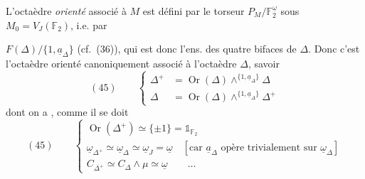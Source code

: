 \documentclass[11pt,a4paper]{article}
\begin{document}
L'octaèdre \emph{orienté} associé à $M$ est défini par le torseur $P_M/\mathbb{F}_2^{\underline{\omega}}$ sous $M_0 = V_J(\mathbb{F}_2)$, i.e. par

$F(\Delta)/\{1, \underline{a}_\Delta\}$ (cf.\ (36)), qui est donc l'ens. des quatre bifaces de $\Delta$. Donc c'est l'octaèdre orienté canoniquement associé à l'octaèdre $\Delta$, savoir
\[
  (45) \qquad
  \left\{
  \begin{aligned}
    \Delta^+ &= \operatorname{Or}(\Delta) \wedge^{\{1, \underline{a}_\Delta\}} \Delta \\
    \Delta &= \operatorname{Or}(\Delta) \wedge^{\{1, \underline{a}_\Delta\}} \Delta^+
  \end{aligned}
  \right.
\]
dont on a , comme il se doit
\[
  (45) \qquad
  \left\{
  \begin{array}{l}
    \operatorname{Or}(\Delta^+) \simeq \{\pm 1\} = \mathbb{1}_{\mathbb{F}_2} \\
    \underline{\omega}_{\Delta^+} \simeq \underline{\omega}_\Delta \simeq \underline{\omega}_J = \underline{\omega} \quad [\text{car } \underline{a}_\Delta \text{ opère trivialement sur } \underline{\omega}_\Delta] \\
    C_{\Delta^+} \simeq C_\Delta \wedge \mu \simeq \underline{\omega} \qquad \ldots
  \end{array}
  \right.
\]
\end{document}
